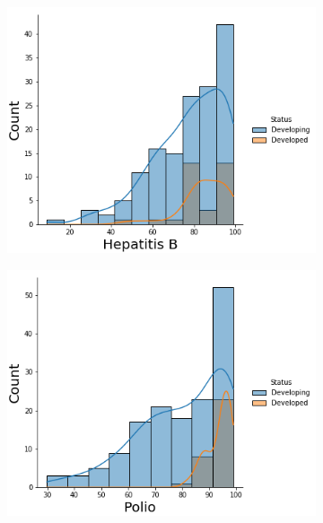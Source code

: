\begin{itemize}
                    
               \begin{figure}[H]
              \centering
              \begin{subfigure}{0.3\linewidth}
                \centering
                \includegraphics[width=\textwidth]{img/3.png}
              \end{subfigure}
              \hfill
                \begin{subfigure}{0.3\linewidth}
                \centering
                \includegraphics[width=\textwidth]{img/4.png}
              \end{subfigure}

\end{figure}
\end{itemize}
